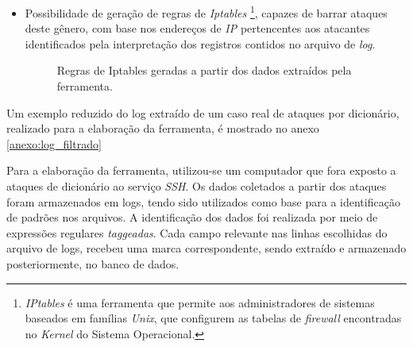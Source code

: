 \begin{itemize}
    \clearpage
    \item Possibilidade de geração de regras de \textit{Iptables} \footnote{\textit{IPtables} é uma ferramenta que permite aos administradores de sistemas baseados em famílias \textit{Unix}, que configurem as tabelas de \textit{firewall} encontradas no \textit{Kernel} do Sistema Operacional.}, capazes de barrar ataques deste gênero, com base nos endereços de \textit{IP} pertencentes aos atacantes identificados pela interpretação dos registros contidos no arquivo de \textit{log}.

    \begin{figure}[h!tp]
        \centering
        \caption{\label{figura:crickets_iptables} Regras de Iptables geradas a partir dos dados extraídos pela ferramenta.}
    \end{figure}

\end{itemize}

Um exemplo reduzido do log extraído de um caso real de ataques por dicionário, realizado para a elaboração da ferramenta, é mostrado no anexo \ref{anexo:log_filtrado}

Para a elaboração da ferramenta, utilizou-se um computador que fora exposto a ataques de dicionário ao serviço \textit{SSH}. Os dados coletados a partir dos ataques foram armazenados em logs, tendo sido utilizados como base para a identificação de padrões nos arquivos. A identificação dos dados foi realizada por meio de expressões regulares \textit{taggeadas}. Cada campo relevante nas linhas escolhidas do arquivo de logs, recebeu uma marca correspondente, sendo extraído e armazenado posteriormente, no banco de dados.

